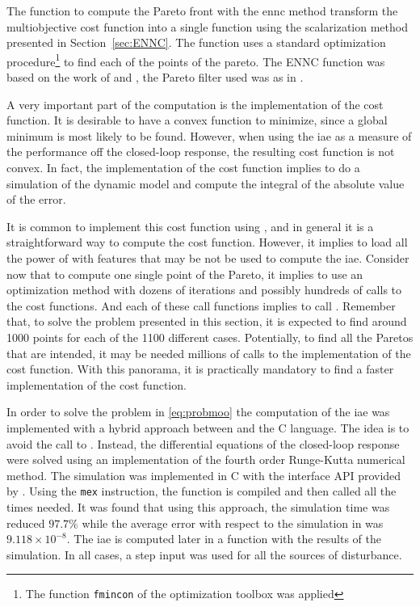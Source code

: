 The function to compute the Pareto front with the \gls{ennc} method transform the multiobjective cost function into a single function using the scalarization method presented in Section~\ref{sec:ENNC}. The function uses a standard optimization procedure\footnote{The function \texttt{fmincon} of the \matlab optimization toolbox was applied} to find each of the points of the pareto. The ENNC function was based on the work of \citet{Houska2011} and \citet{Logist2012}, the Pareto filter used was as in \citet{Cao2020}.

A very important part of the computation is the implementation of the cost function. It is desirable to have a convex function to minimize, since a global minimum is most likely to be found. However, when using the \gls{iae} as a measure of the performance off the closed-loop response, the resulting cost function is not convex. In fact, the implementation of the cost function implies to do a simulation of the dynamic model and compute the integral of the absolute value of the error.

It is common to implement this cost function using \simulink, and in general it is a straightforward way to compute the cost function. However, it implies to load all the power of \simulink with features that may be not be used to compute the \gls{iae}. Consider now that to compute one single point of the Pareto, it implies to use an optimization method with dozens of iterations and possibly hundreds of calls to the cost functions. And each of these call functions implies to call \simulink. Remember that, to solve the problem presented in this section, it is expected to find around 1000 points for each of the 1100 different cases. Potentially, to find all the Paretos that are intended, it may be needed millions of calls to the \simulink implementation of the cost function. With this panorama, it is practically mandatory to find a faster implementation of the cost function.

In order to solve the problem in \eqref{eq:probmoo} the computation of the \gls{iae} was implemented with a hybrid approach between \matlab{} and the C language. The idea is to avoid the call to \simulink. Instead, the differential equations of the closed-loop response were solved using an implementation of the fourth order Runge-Kutta numerical method. The simulation was implemented in C with the interface API provided by \matlab. Using the \texttt{mex} instruction, the function is compiled and then called all the times needed. It was found that using this approach, the simulation time was reduced $97.7\%$ while the average error with respect to the simulation in \simulink was $9.118\times10^{-8}$. The \gls{iae} is computed later in a \matlab function with the results of the simulation. In all cases, a step input was used for all the sources of disturbance.

